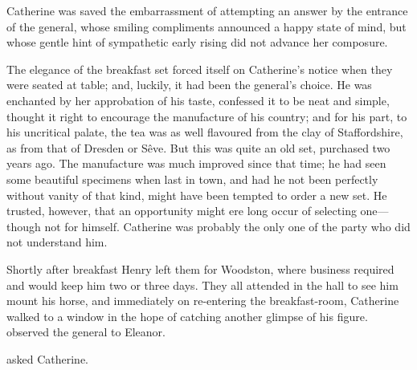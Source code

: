 

Catherine was saved the embarrassment of attempting an answer by the entrance of the general, whose smiling compliments announced a happy state of mind, but whose gentle hint of sympathetic early rising did not advance her composure.

The elegance of the breakfast set forced itself on Catherine's notice when they were seated at table; and, luckily, it had been the general's choice. He was enchanted by her approbation of his taste, confessed it to be neat and simple, thought it right to encourage the manufacture of his country; and for his part, to his uncritical palate, the tea was as well flavoured from the clay of Staffordshire, as from that of Dresden or Sêve. But this was quite an old set, purchased two years ago. The manufacture was much improved since that time; he had seen some beautiful specimens when last in town, and had he not been perfectly without vanity of that kind, might have been tempted to order a new set. He trusted, however, that an opportunity might ere long occur of selecting one---though not for himself. Catherine was probably the only one of the party who did not understand him.

Shortly after breakfast Henry left them for Woodston, where business required and would keep him two or three days. They all attended in the hall to see him mount his horse, and immediately on re-entering the breakfast-room, Catherine walked to a window in the hope of catching another glimpse of his figure.  observed the general to Eleanor. 

 asked Catherine.

